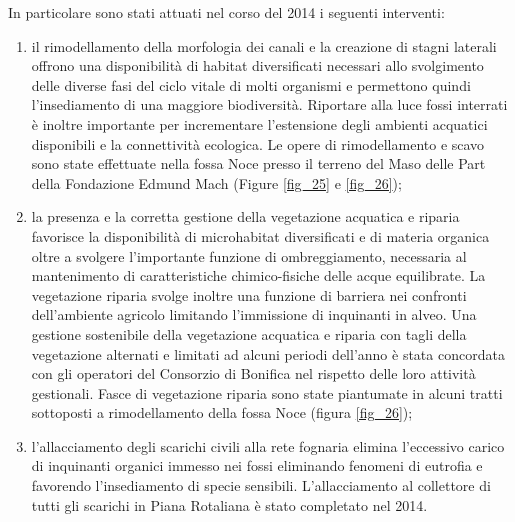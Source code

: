 \documentclass[11pt,a4paper,italian,twoside,openany]{memoir}
\begin{document}
In particolare sono stati attuati nel corso del 2014 i seguenti interventi:
\begin{enumerate}
  \item il rimodellamento della morfologia dei canali e la creazione di stagni laterali offrono una disponibilità di habitat diversificati necessari allo svolgimento delle diverse fasi del ciclo vitale di molti organismi e permettono quindi l'insediamento di una maggiore biodiversità. Riportare alla luce fossi interrati è inoltre importante per incrementare l'estensione degli ambienti acquatici disponibili e la connettività ecologica. Le opere di rimodellamento e scavo sono state effettuate nella fossa Noce presso il terreno del Maso delle Part della Fondazione Edmund Mach (Figure \ref{fig_25} e \ref{fig_26});
  \item la presenza e la corretta gestione della vegetazione acquatica e riparia favorisce la disponibilità di microhabitat diversificati e di materia organica oltre a svolgere l'importante funzione di ombreggiamento, necessaria al mantenimento di caratteristiche chimico-fisiche delle acque equilibrate. La vegetazione riparia svolge inoltre una funzione di barriera nei confronti dell'ambiente agricolo limitando l'immissione di inquinanti in alveo. Una gestione sostenibile della vegetazione acquatica e riparia con tagli della vegetazione alternati e limitati ad alcuni periodi dell'anno è stata concordata con gli operatori del Consorzio di Bonifica nel rispetto delle loro attività gestionali. Fasce di vegetazione riparia sono state piantumate in alcuni tratti sottoposti a rimodellamento della fossa Noce (figura \ref{fig_26});
  \item l'allacciamento degli scarichi civili alla rete fognaria elimina l'eccessivo carico di inquinanti organici immesso nei fossi eliminando fenomeni di eutrofia e favorendo l'insediamento di specie sensibili. L'allacciamento al collettore di tutti gli scarichi in Piana Rotaliana è stato completato nel 2014.
\end{enumerate}
\end{document}
